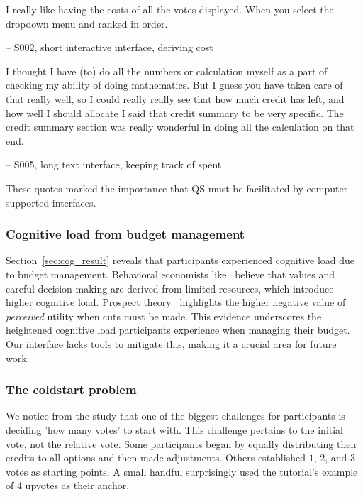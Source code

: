 \begin{displayquote}
I really like having the costs of all the votes displayed. When you select the dropdown menu and ranked in order.

\noindent \hfill -- S002, short interactive interface, deriving cost
\end{displayquote}

\begin{displayquote}
I thought I have \bracketellipsis (to) do all the numbers or calculation myself as a part of checking my ability of doing mathematics. But I guess you have taken care of that really well, so I could really really see that how much credit has left, and \bracketellipsis how well I should allocate \bracketellipsis I said that credit summary to be very specific. The credit summary section was really wonderful in doing all the calculation on that end.

\noindent \hfill -- S005, long text interface, keeping track of spent
\end{displayquote}

These quotes marked the importance that QS must be facilitated by computer-supported interfaces.

\subsubsection{Cognitive load from budget management}
Section~\ref{sec:cog_result} reveals that participants experienced cognitive load due to budget management. Behavioral economists like~\textcite{Shah2015a} believe that values and careful decision-making are derived from limited resources, which introduce higher cognitive load. Prospect theory~\cite{kahnemanProspectTheoryAnalysis1979} highlights the higher negative value of \textit{perceived} utility when cuts must be made. This evidence underscores the heightened cognitive load participants experience when managing their budget. Our interface lacks tools to mitigate this, making it a crucial area for future work.

\subsubsection{The coldstart problem}
We notice from the study that one of the biggest challenges for participants is deciding 'how many votes' to start with. This challenge pertains to the initial vote, not the relative vote. Some participants began by equally distributing their credits to all options and then made adjustments. Others established $1$, $2$, and $3$ votes as starting points. A small handful surprisingly used the tutorial's example of 4 upvotes as their anchor.

